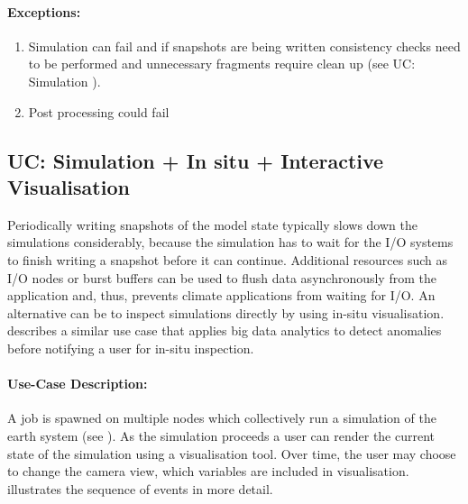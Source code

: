 \paragraph{Exceptions:}
\begin{enumerate}
	\item Simulation can fail and if snapshots are being written consistency checks need to be performed and unnecessary fragments require clean up (see UC: Simulation ).
	\item Post processing could fail
\end{enumerate}





\subsection{UC: Simulation + In situ + Interactive Visualisation}
\label{uc: simulation + in-situ + cam}


Periodically writing snapshots of the model state typically slows down the simulations considerably, because the simulation has to wait for the I/O systems to finish writing a snapshot before it can continue.
Additional resources such as I/O nodes or burst buffers can be used to flush data asynchronously from the application and, thus, prevents climate applications from waiting for I/O.
An alternative can be to inspect simulations directly by using in-situ visualisation.
 describes a similar use case that applies big data analytics to detect anomalies before notifying a user for in-situ inspection.


\paragraph{Use-Case Description:}
A job is spawned on multiple nodes which collectively run a simulation of the earth system (see ).
As the simulation proceeds a user can render the current state of the simulation using a visualisation tool.
Over time, the user may choose to change the camera view, which variables are included in visualisation.
 illustrates the sequence of events in more detail.

